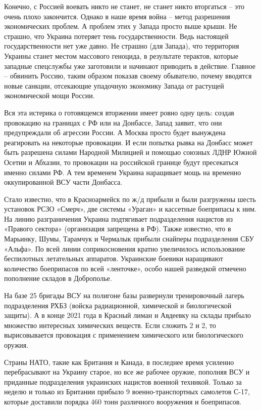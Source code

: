Конечно, с Россией воевать никто не станет, не станет никто вторгаться – это
очень плохо закончится. Однако в наше время война – метод разрешения
экономических проблем. А проблем этих у Запада просто выше крыши. Не страшно,
что Украина потеряет тень государственности. Ведь настоящей государственности
нет уже давно. Не страшно (для Запада), что территория Украины станет местом
массового геноцида, в результате терактов, которые западные спецслужбы уже
заготовили и начинают приводить в действие. Главное – обвинить Россию, таким
образом показав своему обывателю, почему вводятся новые санкции, отсекающие
упадочную экономику Запада от растущей экономической мощи России.

Вся эта истерика о готовящемся вторжении имеет ровно одну цель: создав
провокацию на границах с РФ или на Донбассе, Запад заявит, что они
предупреждали об агрессии России. А Москва просто будет вынуждена реагировать
на некоторые провокации. И если попытка рывка на Донбасс может быть разрешена
силами Народной Милицией и помощью союзных ЛДНР Южной Осетии и Абхазии, то
провокации на российской границе будут пресекаться именно силами РФ. А тем
временем Украина наращивает мощь на временно оккупированной ВСУ части Донбасса.

Стало известно, что в Красноармейск по ж/д прибыли и были разгружены шесть
установок РСЗО «Смерч», две системы «Ураган» и кассетные боеприпасы к ним. На
линию разграничения Украина подтягивает подразделения нацистов из «Правого
сектора» (организация запрещена в РФ). Также известно, что в Марьинку, Шумы,
Тарамчук и Чермалык прибыли снайперы подразделения СБУ «Альфа». По всей линии
соприкосновения кратно увеличилось использование беспилотных летательных
аппаратов. Украинские боевики наращивают количество боеприпасов по всей
«ленточке», особо нашей разведкой отмечено пополнение складов в Доброполье.

На базе 25 бригады ВСУ на полигоне базы развернули тренировочный лагерь
подразделения РХБЗ (войска радиационной, химической и биологической защиты). А
в конце 2021 года в Красный лиман и Авдеевку на склады прибыло множество
интересных химических веществ. Если сложить 2 и 2, то вырисовывается провокация
с применением химического или биологического оружия.

Страны НАТО, такие как Британия и Канада, в последнее время усиленно
перебрасывают на Украину старое, но все же рабочее оружие, пополняя ВСУ и
приданные подразделения украинских нацистов военной техникой. Только за неделю
и только из Британии прибыло 9 военно-транспортных самолетов С-17, которые
доставили порядка 460 тонн различного вооружения и боеприпасов.

